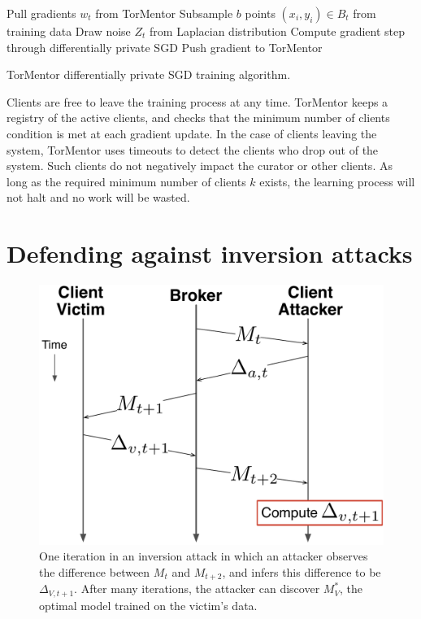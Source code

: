 
\begin{algorithm}[t]
   {
    Pull gradients $w_t$ from TorMentor\;
    Subsample $b$ points $(x_i, y_i) \in B_t$ from training data\;
    Draw noise $Z_t$ from Laplacian distribution\;
    Compute gradient step through differentially private SGD\;
    Push gradient to TorMentor
  }
  \caption{TorMentor differentially private SGD training algorithm.
  \label{alg:training}}
\end{algorithm}

Clients are free to leave the training process at any time. TorMentor
keeps a registry of the active clients, and checks that the minimum
number of clients condition is met at each gradient update. In
the case of clients leaving the system, TorMentor uses timeouts to
detect the clients who drop out of the system. Such clients do not
negatively impact the curator or other clients. As long as the required
minimum number of clients $k$ exists, the learning process will not
halt and no work will be wasted.

\section{Defending against inversion attacks}

\begin{figure}[t]
  \centering
  \includegraphics[width=.8\linewidth]{fig/inversionattack.pdf}
  \caption{One iteration in an inversion attack in which an attacker
    observes the difference between $M_t$ and $M_{t+2}$, and infers
    this difference to be $\Delta_{V,t+1}$. After many iterations,
    the attacker can discover $M^*_V$, the optimal model trained on
    the victim's data.}
  \label{fig:inversion-timespace}
\end{figure}

